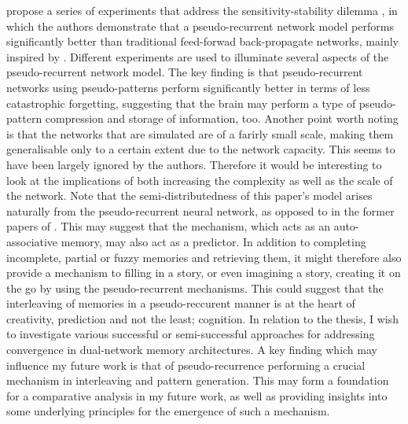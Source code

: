 \citep{French1997} propose a series of experiments that address the sensitivity-stability dilemma \citep{Hebb1949}, in which the authors demonstrate that a pseudo-recurrent network model performs significantly better than traditional feed-forwad back-propagate networks, mainly inspired by \cite{McClelland1995}. Different experiments are used to illuminate several aspects of the pseudo-recurrent network model. The key finding is that pseudo-recurrent networks using pseudo-patterns perform significantly better in terms of less catastrophic forgetting, suggesting that the brain may perform a type of pseudo-pattern compression and storage of information, too. Another point worth noting is that the networks that are simulated are of a farirly small scale, making them generalisable only to a certain extent due to the network capacity. This seems to have been largely ignored by the authors. Therefore it would be interesting to look at the implications of both increasing the complexity as well as the scale of the network. Note that the semi-distributedness of this paper's model arises naturally from the pseudo-recurrent neural network, as opposed to in the former papers of \cite{French1992, French1994}. This may suggest that the mechanism, which acts as an auto-associative memory, may also act as a predictor. In addition to completing incomplete, partial or fuzzy memories and retrieving them, it might therefore also provide a mechanism to filling in a story, or even imagining a story, creating it on the go by using the pseudo-recurrent mechanisms. This could suggest that the interleaving of memories in a pseudo-reccurent manner is at the heart of creativity, prediction and not the least; cognition. In relation to the thesis, I wish to investigate various successful or semi-successful approaches for addressing convergence in dual-network memory architectures. A key finding which may influence my future work is that of pseudo-recurrence performing a crucial mechanism in interleaving and pattern generation. This may form a foundation for a comparative analysis in my future work, as well as providing insights into some underlying principles for the emergence of such a mechanism.

